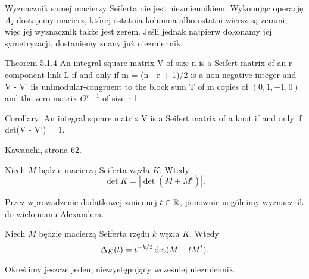 Wyznacznik samej macierzy Seiferta nie jest niezmiennikiem.
Wykonując operację $\Lambda_2$ dostajemy macierz, której ostatnia kolumna albo ostatni wiersz są zerami, więc jej wyznacznik także jest zerem.
Jeśli jednak najpierw dokonamy jej symetryzacji, dostaniemy znany już niezmiennik.

\begin{tobedone}
Theorem 5.1.4 An integral square matrix V of size n is a Seifert matrix of an r-component link L if and only if m = (n - r + 1)/2 is a non-negative integer and
V - V' iis unimodular-congruent to the block sum T of m copies of $(0, 1, -1, 0)$ and
the zero matrix $O^{r-1}$ of size r-1.

Corollary: An integral square matrix V is a Seifert matrix of a knot if and only if det(V - V') = 1.

Kawauchi, strona 62.
\end{tobedone}

\begin{proposition}
    Niech $M$ będzie macierzą Seiferta węzła $K$.
    Wtedy
    \begin{equation}
        \det K = |\det(M + M^t)|.
    \end{equation}
\end{proposition}

Przez wprowadzenie dodatkowej zmiennej $t \in \mathbb R$, ponownie uogólnimy wyznacznik do wielomianu Alexandera.

\begin{proposition}
    Niech $M$ będzie macierzą Seiferta rzędu $k$ węzła $K$.
    Wtedy
    \begin{equation}
        \Delta_K (t) = t^{-k/2}\det(M - tM^t).
    \end{equation}
\end{proposition}

Określimy jeszcze jeden, niewystępujący wcześniej niezmiennik.

